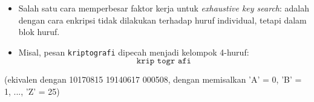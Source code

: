 \documentclass{article}
\begin{document}

\begin{itemize}
    \item Salah satu cara memperbesar faktor kerja untuk \textit{exhaustive key search}: adalah dengan cara enkripsi tidak dilakukan terhadap huruf individual, tetapi dalam blok huruf.
    \item Misal, pesan \texttt{kriptografi} dipecah menjadi kelompok 4-huruf:
    \[ \texttt{krip togr afi} \]
\end{itemize}

(ekivalen dengan 10170815 19140617 000508, dengan memisalkan 'A' = 0, 'B' = 1, ..., 'Z' = 25)
\end{document}
